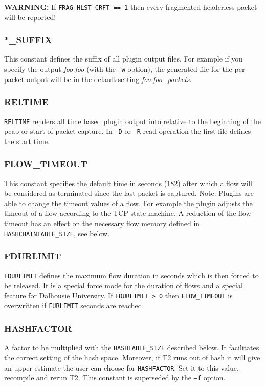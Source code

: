 {\bf WARNING:} If {\tt FRAG\_HLST\_CRFT == 1} then every fragmented headerless packet will be reported!

\subsubsection{*\_SUFFIX}\label{file_suffixes}
This constant defines the suffix of all plugin output files. For example if you specify the output {\em foo.foo} (with the {\tt --w} option), the generated file for the per-packet output will be in the default setting {\em foo.foo\_packets}.

\subsubsection{RELTIME}
{\tt RELTIME} renders all time based plugin output into relative to the beginning of the pcap or start of packet capture. In {\tt --D} or {\tt --R} read operation the first file defines the start time.

\subsubsection{FLOW\_TIMEOUT}
This constant specifies the default time in seconds (182) after which a flow will be considered as terminated since the last packet is captured. Note: Plugins are able to change the timeout values of a flow. For example the  plugin adjusts the timeout of a flow according to the TCP state machine. A reduction of the flow timeout has an effect on the necessary flow memory defined in {\tt HASHCHAINTABLE\_SIZE}, see below.

\subsubsection{FDURLIMIT}
{\tt FDURLIMIT} defines the maximum flow duration in seconds which is then forced to be released.
It is a special force mode for the duration of flows and a special feature for Dalhousie University.
If {\tt FDURLIMIT > 0} then {\tt FLOW\_TIMEOUT} is overwritten if {\tt FURLIMIT} seconds are reached.

\subsubsection{HASHFACTOR}
A factor to be multiplied with the {\tt HASHTABLE\_SIZE} described below.
It facilitates the correct setting of the hash space.
Moreover, if T2 runs out of hash it will give an upper estimate the user can choose for {\tt HASHFACTOR}.
Set it to this value, recompile and rerun T2.
This constant is superseded by the \hyperref[s:foption]{{\tt --f} option}.

